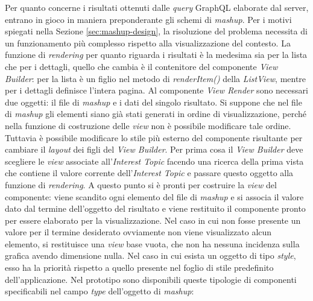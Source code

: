 Per quanto concerne i risultati ottenuti dalle \emph{query} GraphQL elaborate dal server, entrano in gioco in maniera preponderante gli schemi di \emph{mashup}. Per i motivi spiegati nella Sezione \ref{sec:mashup-design}, la risoluzione del problema necessita di un funzionamento più complesso rispetto alla visualizzazione del contesto. La funzione di \emph{rendering} per quanto riguarda i risultati è la medesima sia per la lista che per i dettagli, quello che cambia è il contenitore del componente \emph{View Builder}: per la lista è un figlio nel metodo di \emph{renderItem()} della \emph{ListView}, mentre per i dettagli definisce l'intera pagina.
Al componente \emph{View Render} sono necessari due oggetti: il file di \emph{mashup} e i dati del singolo risultato.
Si suppone che nel file di \textit{mashup} gli elementi siano già stati generati in ordine di visualizzazione, perché nella funzione di costruzione delle \emph{view} non è possibile modificare tale ordine. Tuttavia è possibile modificare lo stile più esterno del componente risultante per cambiare il \emph{layout} dei figli del \emph{View Builder}. Per prima cosa il \emph{View Builder} deve scegliere le \emph{view} associate all'\emph{Interest Topic} facendo una ricerca della prima vista che contiene il valore corrente dell'\emph{Interest Topic} e passare questo oggetto alla funzione di \textit{rendering}. A questo punto si è pronti per costruire la \emph{view} del componente: viene scandito ogni elemento del file di \textit{mashup} e si associa il valore dato dal termine dell'oggetto del risultato e viene restituito il componente pronto per essere elaborato per la visualizzazione. Nel caso in cui non fosse presente un valore per il termine desiderato ovviamente non viene visualizzato alcun elemento, si restituisce una \emph{view} base vuota, che non ha nessuna incidenza sulla grafica avendo dimensione nulla. Nel caso in cui esista un oggetto di tipo \emph{style}, esso ha la priorità rispetto a quello presente nel foglio di stile predefinito dell'applicazione. Nel prototipo sono disponibili queste tipologie di componenti specificabili nel campo \emph{type} dell'oggetto di \textit{mashup}:

